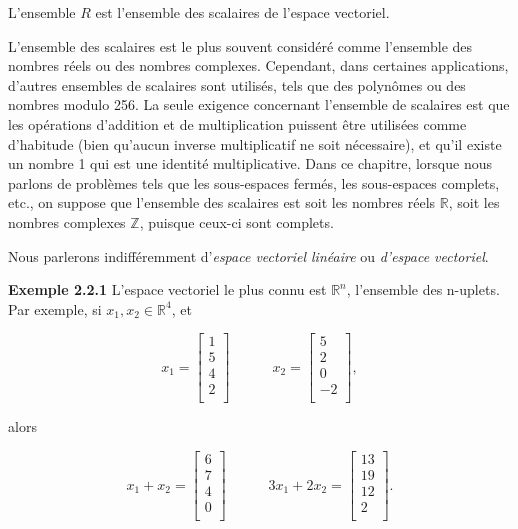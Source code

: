 \documentclass[10pt,twoside,a4paper]{book}
\begin{document}
\noindent
L'ensemble $R$ est l'ensemble des scalaires de l'espace vectoriel.
\vspace{3mm}

L'ensemble des scalaires est le plus souvent considéré comme l'ensemble des nombres réels ou des nombres complexes. Cependant, dans certaines applications, d'autres ensembles de scalaires sont utilisés, tels que des polynômes ou des nombres modulo 256. 
La seule exigence concernant l'ensemble de scalaires est que les opérations d'addition et de multiplication puissent être utilisées comme d'habitude (bien qu'aucun inverse multiplicatif ne soit nécessaire), et qu'il existe un nombre 1 qui est une identité multiplicative. 
Dans ce chapitre, lorsque nous parlons de problèmes tels que les sous-espaces fermés, les sous-espaces complets, etc., on suppose que l'ensemble des scalaires est soit les nombres réels $\mathbb{R}$, soit les nombres complexes $\mathbb{Z}$, puisque ceux-ci sont complets.

Nous parlerons indifféremment d'\textit{espace vectoriel linéaire} ou \textit{d'espace vectoriel}.

\vspace{4mm}
\noindent
\textbf{Exemple 2.2.1} L'espace vectoriel le plus connu est $\mathbb{R}^n$, l'ensemble des n-uplets. Par exemple, si $x_1, x_2 \in \mathbb{R}^4$, et

\begin{equation*}
  x_1 = \begin{bmatrix}
    1 \\
    5 \\
    4 \\
    2 \\
  \end{bmatrix}
  \quad \quad \quad
  x_2 = \begin{bmatrix}
    5 \\
    2 \\
    0 \\
    -2 \\
  \end{bmatrix},
\end{equation*}

alors

\begin{equation*}
  x_1 + x_2 = \begin{bmatrix}
    6 \\
    7 \\
    4 \\
    0 \\
  \end{bmatrix}
  \quad \quad \quad
  3x_1 + 2x_2 = \begin{bmatrix}
    13 \\
    19 \\
    12 \\
    2 \\
  \end{bmatrix}.
\end{equation*}
\end{document}
